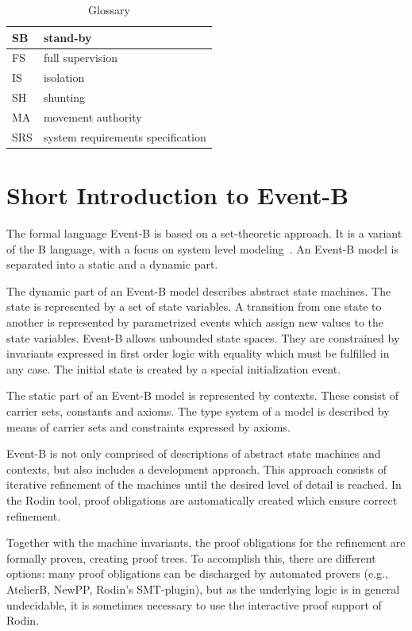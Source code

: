 \documentclass{template/openetcs_article}
\begin{document}
\begin{table}[ht]
  \centering
  \begin{tabular}[ht]{|l|l|}
    \hline
    SB & stand-by \\
    \hline
    FS & full supervision \\
    \hline
    IS & isolation \\
    \hline
    SH & shunting \\
    \hline
    MA & movement authority \\
    \hline
    SRS & system requirements specification \\
    \hline
  \end{tabular}
  \caption{Glossary}
  \label{tab:glossary}
\end{table}

\section{Short Introduction to Event-B}
\label{sec:short-intr-event}

The formal language Event-B is based on a set-theoretic approach. It is a
variant of the B language, with a focus on system level
modeling~\cite{eventbbook}. An Event-B model is separated into a static and a
dynamic part.

The dynamic part of an Event-B model describes abstract state machines. The
state is represented by a set of state variables. A transition from one state to
another is represented by parametrized events which assign new values to the
state variables. Event-B allows unbounded state spaces. They are constrained by
invariants expressed in first order logic with equality which must be fulfilled
in any case. The initial state is created by a special initialization event.

The static part of an Event-B model is represented by contexts. These consist of
carrier sets, constants and axioms. The type system of a model is described by
means of carrier sets and constraints expressed by axioms.

Event-B is not only comprised of descriptions of abstract state machines and
contexts, but also includes a development approach. This approach consists of
iterative refinement of the machines until the desired level of detail is
reached. In the Rodin tool, proof obligations are automatically created which
ensure correct refinement.

Together with the machine invariants, the proof obligations for the refinement
are formally proven, creating proof trees. To accomplish this, there are
different options: many proof obligations can be discharged by automated provers
(e.g., AtelierB, NewPP, Rodin's SMT-plugin), but as the underlying logic is in
general undecidable, it is sometimes necessary to use the interactive proof
support of Rodin.
\end{document}
